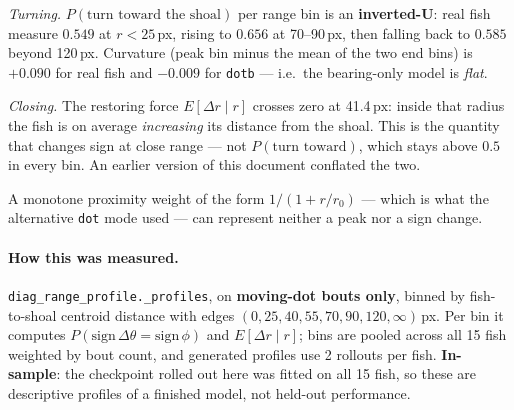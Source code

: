 \documentclass[11pt,a4paper]{article}
\newcommand{\uu}[1]{\ensuremath{\,\mathrm{#1}}}  %
\newcommand{\dth}{\ensuremath{\Delta\theta}}
\newcommand{\code}[1]{\texttt{\small #1}}
\begin{document}
\emph{Turning.} $P(\text{turn toward the shoal})$ per range bin is an
\textbf{inverted-U}: real fish measure $0.549$ at $r<25$\,px, rising to $0.656$ at
70--90\,px, then falling back to $0.585$ beyond 120\,px. Curvature (peak bin minus the mean
of the two end bins) is $+0.090$ for real fish and $-0.009$ for \code{dotb} --- i.e.\ the
bearing-only model is \emph{flat}.

\emph{Closing.} The restoring force $E[\Delta r \mid r]$ crosses zero at
41.4\uu{px}: inside that radius the fish is on average \emph{increasing} its distance
from the shoal. This is the quantity that changes sign at close range --- not
$P(\text{turn toward})$, which stays above $0.5$ in every bin. An earlier version of this
document conflated the two.

A monotone proximity weight of the form $1/(1+r/r_0)$ --- which is what the alternative
\code{dot} mode used --- can represent neither a peak nor a sign change.

\paragraph{How this was measured.}
\code{diag\_range\_profile.\_profiles}, on \textbf{moving-dot bouts only}, binned by
fish-to-shoal centroid distance with edges $(0,25,40,55,70,90,120,\infty)$\,px. Per bin it
computes $P(\mathrm{sign}\,\dth = \mathrm{sign}\,\phi)$ and $E[\Delta r\mid r]$; bins are
pooled across all 15 fish weighted by bout count, and generated profiles use 2 rollouts per
fish. \textbf{In-sample}: the checkpoint rolled out here was fitted on all 15 fish, so these
are descriptive profiles of a finished model, not held-out performance.
\end{document}
